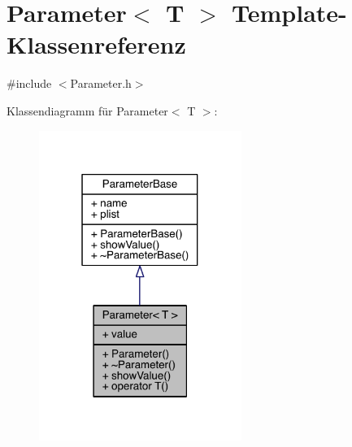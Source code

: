\hypertarget{class_parameter}{}\section{Parameter$<$ T $>$ Template-\/\+Klassenreferenz}
\label{class_parameter}


{\ttfamily \#include $<$Parameter.\+h$>$}



Klassendiagramm für Parameter$<$ T $>$\+:\nopagebreak
\begin{figure}[H]
\begin{center}
\leavevmode
\includegraphics[width=187pt]{class_parameter__inherit__graph}
\end{center}
\end{figure}


